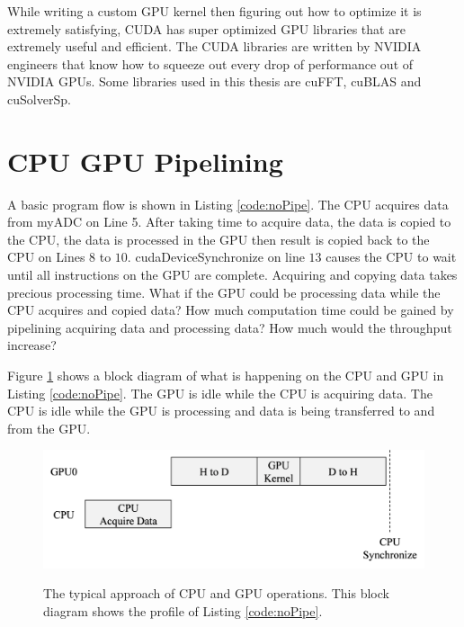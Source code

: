 While writing a custom GPU kernel then figuring out how to optimize it is extremely satisfying,
CUDA has super optimized GPU libraries that are extremely useful and efficient.
The CUDA libraries are written by NVIDIA engineers that know how to squeeze out every drop of performance out of NVIDIA GPUs.
Some libraries used in this thesis are cuFFT, cuBLAS and cuSolverSp.

\section{CPU GPU Pipelining}
A basic program flow is shown in Listing \ref{code:noPipe}.
The CPU acquires data from myADC on Line 5.
After taking time to acquire data, the data is copied to the CPU, the data is processed in the GPU then result is copied back to the CPU on Lines $8$ to $10$.
cudaDeviceSynchronize on line $13$ causes the CPU to wait until all instructions on the GPU are complete.
Acquiring and copying data takes precious processing time.
What if the GPU could be processing data while the CPU acquires and copied data?
How much computation time could be gained by pipelining acquiring data and processing data?
How much would the throughput increase?

Figure \ref{fig:concurrentCPU_nonBlocking} shows a block diagram of what is happening on the CPU and GPU in Listing \ref{code:noPipe}.
The GPU is idle while the CPU is acquiring data.
The CPU is idle while the GPU is processing and data is being transferred to and from the GPU.
\begin{figure}
	\centering\includegraphics[width=8.77in/100*55]{figures/gpu_intro/concurrentCPU_nonBlocking.pdf}
	\label{fig:concurrentCPU_nonBlocking}
	\caption{The typical approach of CPU and GPU operations. This block diagram shows the profile of Listing \ref{code:noPipe}.}
\end{figure}

